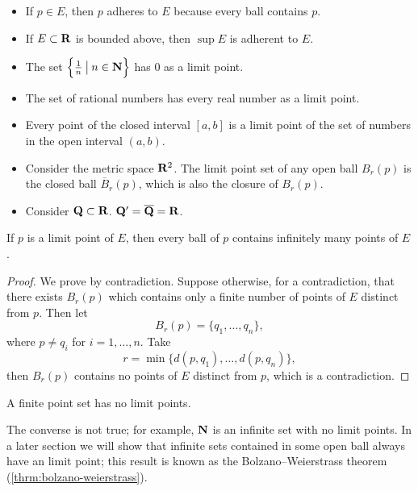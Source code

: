 \begin{example}
\begin{itemize}
\item If $p\in E$, then $p$ adheres to $E$ because every ball contains $p$.
\item If $E\subset\mathbf R$ is bounded above, then $\sup E$ is adherent to $E$.
\end{itemize}
\end{example}

\begin{example}
\begin{itemize}
\item The set $\left\{\frac{1}{n}\:\big|\:n\in\mathbf N\right\}$ has $0$ as a limit point.
\item The set of rational numbers has every real number as a limit point.
\item Every point of the closed interval $[a,b]$ is a limit point of the set of numbers in the open interval $(a,b)$.
\item Consider the metric space $\mathbf R^2$. The limit point set of any open ball $B_r(p)$ is the closed ball $\overline{B}_r(p)$, which is also the closure of $B_r(p)$.
\item Consider $\mathbf Q\subset\mathbf R$. $\mathbf Q^\prime=\overline{\mathbf Q}=\mathbf R$.
\end{itemize}
\end{example}

\begin{proposition}\label{prop:limit-point-inf-points}
If $p$ is a limit point of $E$, then every ball of $p$ contains infinitely many points of $E$.
\end{proposition}

\begin{proof}
We prove by contradiction. Suppose otherwise, for a contradiction, that there exists $B_r(p)$ which contains only a finite number of points of $E$ distinct from $p$. Then let
\[B_r(p)=\{q_1,\dots,q_n\},\]
where $p\neq q_i$ for $i=1,\dots,n$. 
Take
\[r=\min\{d(p,q_1),\dots,d(p,q_n)\},\]
then $B_r(p)$ contains no points of $E$ distinct from $p$, which is a contradiction.
\end{proof}

\begin{corollary}
A finite point set has no limit points.
\end{corollary}

\begin{remark}
The converse is not true; for example, $\mathbf N$ is an infinite set with no limit points. In a later section we will show that infinite sets contained in some open ball always have an limit point; this result is known as the Bolzano--Weierstrass theorem (\cref{thrm:bolzano-weierstrass}).
\end{remark}

